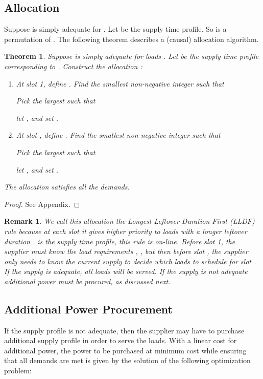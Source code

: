 \documentclass[10pt,draftcls,onecolumn]{IEEEtran}
\newtheorem{theorem}{Theorem}
\newtheorem{remark}{Remark}
\newcounter{l1}
\newcounter{l2}
\newcounter{l3}
\begin{document}
\subsection{Allocation}
Suppose  is simply adequate for . Let  be the supply time profile.  So  is a permutation of .   The following theorem describes a (causal) allocation algorithm.
\begin{theorem}\label{thm:continuum_allocation}
Suppose  is simply adequate for  loads .  Let  be the supply time profile corresponding to   . Construct the  allocation :
\begin{enumerate}
\item At slot 1, define . Find the smallest non-negative integer  such that

Pick the largest  such that

let  , and set .
\item At slot , define . Find the smallest non-negative integer  such that

Pick the largest  such that

let  , and set .
\end{enumerate}
The allocation  satisfies all the demands.
\end{theorem}
\begin{proof}
See Appendix.
\end{proof}
\begin{remark}
We call this allocation the Longest Leftover Duration First (LLDF) rule because at each slot  it gives higher priority to loads with a longer leftover duration .
 is the supply time profile, this rule is on-line. 
 Before slot 1, the supplier must know the load requirements , , but
then before slot , the supplier only needs to know the current supply  to decide which loads to schedule for slot .  If the supply is adequate, all loads will be served.  If the supply is not adequate additional power must be procured, as discussed next.
\end{remark}

\subsection{Additional Power Procurement}
If the supply profile  is not adequate, then the supplier may have to purchase additional supply profile  in order to serve the loads. 
With a linear cost for  additional power, the  power to be purchased at minimum cost while ensuring that all demands are met is given by the solution of the following optimization problem:
\end{document}
